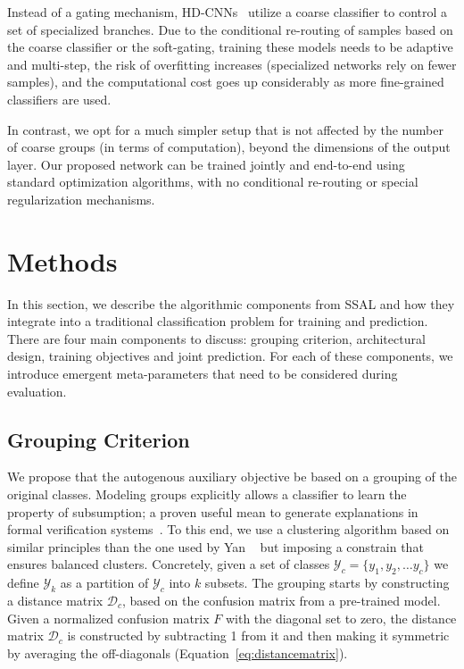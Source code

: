 \documentclass[10pt,twocolumn,letterpaper]{article}
\begin{document}
Instead of a gating mechanism, HD-CNNs~\cite{yan2015hd} utilize a coarse classifier to control a set of specialized branches.
Due to the conditional re-routing of samples based on the coarse classifier or the soft-gating, training these models needs to be adaptive and multi-step, the risk of overfitting increases (specialized networks rely on fewer samples), and the computational cost goes up considerably as more fine-grained classifiers are used.

In contrast, we opt for a much simpler setup that is not affected by the number of coarse groups (in terms of computation), beyond the dimensions of the output layer.
Our proposed network can be trained jointly and end-to-end using standard optimization algorithms, with no conditional re-routing or special regularization mechanisms.




\section{Methods}
\label{sec:methods}

In this section, we describe the algorithmic components from SSAL and how they integrate into a traditional classification problem for training and prediction.
There are four main components to discuss: grouping criterion, architectural design, training objectives and joint prediction.
For each of these components, we introduce emergent meta-parameters that need to be considered during evaluation.

\subsection{Grouping Criterion}
\label{subsec:grouping}
We propose that the autogenous auxiliary objective be based on a grouping of the original classes.
Modeling groups explicitly allows a classifier to learn the property of subsumption; a proven useful mean to generate explanations in formal verification systems~\cite{mcguinness1995explaining}.
To this end, we use a clustering algorithm based on similar principles than the one used by Yan \etal~\cite{yan2015hd} but imposing a constrain that ensures balanced clusters.
Concretely, given a set of classes $\mathcal{Y}_c = \{y_1, y_2, \dots y_c\}$ we define $\mathcal{Y}_k$ as a partition of $\mathcal{Y}_c$ into $k$ subsets.
The grouping starts by constructing a distance matrix $\mathcal{D}_c$, based on the confusion matrix from a pre-trained model.
Given a normalized confusion matrix $F$ with the diagonal set to zero, the distance matrix $\mathcal{D}_c$ is constructed by subtracting 1 from it and then making it symmetric by averaging the off-diagonals (Equation~\ref{eq:distancematrix}).
\end{document}
